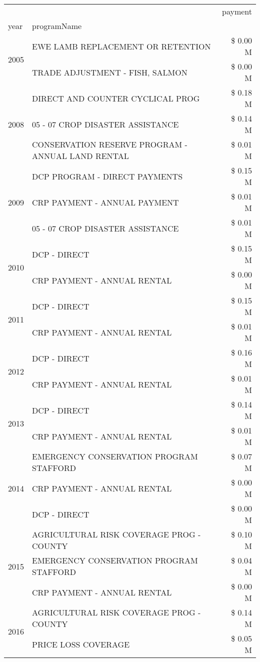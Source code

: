 \begin{tabular}{llr}
\toprule
 &  & payment \\
year & programName &  \\
\midrule
\multirow[t]{2}{*}{2005} & EWE LAMB REPLACEMENT OR RETENTION & \$ 0.00 M \\
 & TRADE ADJUSTMENT - FISH, SALMON & \$ 0.00 M \\
\cline{1-3}
\multirow[t]{3}{*}{2008} & DIRECT AND COUNTER CYCLICAL PROG & \$ 0.18 M \\
 & 05 - 07 CROP DISASTER ASSISTANCE & \$ 0.14 M \\
 & CONSERVATION RESERVE PROGRAM - ANNUAL LAND RENTAL & \$ 0.01 M \\
\cline{1-3}
\multirow[t]{3}{*}{2009} & DCP PROGRAM - DIRECT PAYMENTS & \$ 0.15 M \\
 & CRP PAYMENT - ANNUAL PAYMENT & \$ 0.01 M \\
 & 05 - 07 CROP DISASTER ASSISTANCE & \$ 0.01 M \\
\cline{1-3}
\multirow[t]{2}{*}{2010} & DCP - DIRECT & \$ 0.15 M \\
 & CRP PAYMENT - ANNUAL RENTAL & \$ 0.00 M \\
\cline{1-3}
\multirow[t]{2}{*}{2011} & DCP - DIRECT & \$ 0.15 M \\
 & CRP PAYMENT - ANNUAL RENTAL & \$ 0.01 M \\
\cline{1-3}
\multirow[t]{2}{*}{2012} & DCP - DIRECT & \$ 0.16 M \\
 & CRP PAYMENT - ANNUAL RENTAL & \$ 0.01 M \\
\cline{1-3}
\multirow[t]{2}{*}{2013} & DCP - DIRECT & \$ 0.14 M \\
 & CRP PAYMENT - ANNUAL RENTAL & \$ 0.01 M \\
\cline{1-3}
\multirow[t]{3}{*}{2014} & EMERGENCY CONSERVATION PROGRAM STAFFORD & \$ 0.07 M \\
 & CRP PAYMENT - ANNUAL RENTAL & \$ 0.00 M \\
 & DCP - DIRECT & \$ 0.00 M \\
\cline{1-3}
\multirow[t]{3}{*}{2015} & AGRICULTURAL RISK COVERAGE PROG - COUNTY & \$ 0.10 M \\
 & EMERGENCY CONSERVATION PROGRAM STAFFORD & \$ 0.04 M \\
 & CRP PAYMENT - ANNUAL RENTAL & \$ 0.00 M \\
\cline{1-3}
\multirow[t]{3}{*}{2016} & AGRICULTURAL RISK COVERAGE PROG - COUNTY & \$ 0.14 M \\
 & PRICE LOSS COVERAGE & \$ 0.05 M \\

\end{tabular}
